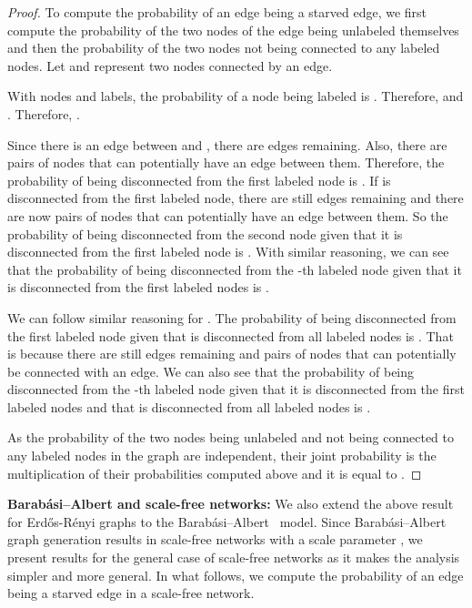 \documentclass{article}
\newtheorem{proof}{Proof}
\begin{document}
\begin{proof}
To compute the probability of an edge being a starved edge, we first compute the probability of the two nodes of the edge being unlabeled themselves and then the probability of the two nodes not being connected to any labeled nodes. Let  and  represent two nodes connected by an edge.

With  nodes and  labels, the probability of a node being labeled is . Therefore,  and . Therefore, . 

Since there is an edge between  and , there are  edges remaining. Also, there are  pairs of nodes that can potentially have an edge between them. Therefore, the probability of  being disconnected from the first labeled node is . If  is disconnected from the first labeled node, there are still  edges remaining and there are now  pairs of nodes that can potentially have an edge between them. So the probability of  being disconnected from the second node given that it is disconnected from the first labeled node is . With similar reasoning, we can see that the probability of  being disconnected from the -th labeled node given that it is disconnected from the first  labeled nodes is .

We can follow similar reasoning for . The probability of  being disconnected from the first labeled node given that  is disconnected from all  labeled nodes is . That is because there are still  edges remaining and  pairs of nodes that can potentially be connected with an edge. We can also see that the probability of  being disconnected from the -th labeled node given that it is disconnected from the first  labeled nodes and that  is disconnected from all  labeled nodes is .


As the probability of the two nodes being unlabeled and not being connected to any labeled nodes in the graph are independent, their joint probability is the multiplication of their probabilities computed above and it is equal to .
\end{proof}

\textbf{Barabási–Albert and scale-free networks:} We also extend the above result for Erd\H{o}s-R\'enyi graphs to the Barabási–Albert~\cite{barabasi1999emergence} model. Since Barabási–Albert graph generation results in scale-free networks with a scale parameter , we present results for the general case of scale-free networks as it makes the analysis simpler and more general. In what follows, we compute the probability of an edge being a starved edge in a scale-free network.
\end{document}
